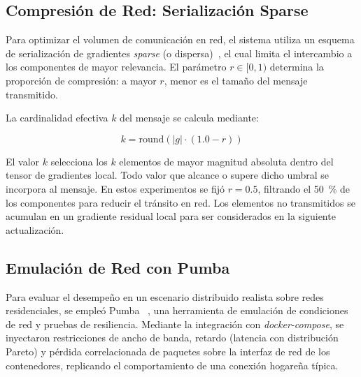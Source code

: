 \subsection{Compresión de Red: Serialización Sparse}

Para optimizar el volumen de comunicación en red, el sistema utiliza un esquema de serialización de gradientes \emph{sparse} (o dispersa)~\cite{aji-heafield-2017-sparse}, el cual limita el intercambio a los componentes de mayor relevancia. El parámetro $r \in [0, 1)$ determina la proporción de compresión: a mayor $r$, menor es el tamaño del mensaje transmitido.

La cardinalidad efectiva $k$ del mensaje se calcula mediante:

\begin{equation}
k = \text{round}\left(|g| \cdot (1.0 - r)\right)
\end{equation}

El valor $k$ selecciona los $k$ elementos de mayor magnitud absoluta dentro del tensor de gradientes local. Todo valor que alcance o supere dicho umbral se incorpora al mensaje. En estos experimentos se fijó $r = 0.5$, filtrando el \qty[round-precision=0]{50}{\percent} de los componentes para reducir el tránsito en red. Los elementos no transmitidos se acumulan en un gradiente residual local para ser considerados en la siguiente actualización.

\subsection{Emulación de Red con Pumba}

Para evaluar el desempeño en un escenario distribuido realista sobre redes residenciales, se empleó Pumba ~\cite{pumba}, una herramienta de emulación de condiciones de red y pruebas de resiliencia. Mediante la integración con \emph{docker-compose}, se inyectaron restricciones de ancho de banda, retardo (latencia con distribución Pareto) y pérdida correlacionada de paquetes sobre la interfaz de red de los contenedores, replicando el comportamiento de una conexión hogareña típica.

